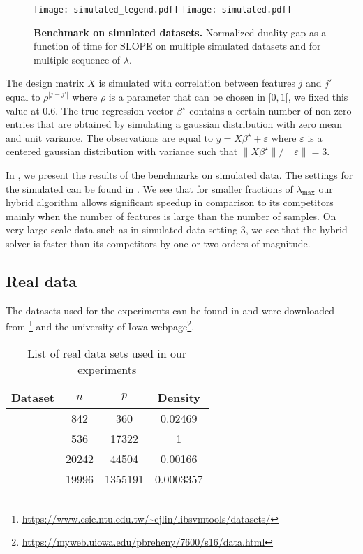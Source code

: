 \begin{figure*}[!t]
  \centering
  \texttt{[image: simulated\_legend.pdf]}
  \texttt{[image: simulated.pdf]}
  \caption{\textbf{Benchmark on simulated datasets.} Normalized duality gap as a function of time for SLOPE on multiple simulated datasets and for multiple sequence of $\lambda$.}
  \label{fig:simulated}
\end{figure*}

The design matrix $X$ is simulated with correlation between features $j$ and $j'$ equal to $\rho^{|j-j'|}$ where $\rho$ is a parameter that can be chosen in $[0, 1[$, we fixed this value at $0.6$.
The true regression vector $\beta^\star$ contains a certain number of non-zero entries that are obtained by simulating a gaussian distribution with zero mean and unit variance.
The observations are equal to $y=X\beta^\star + \varepsilon$ where $\varepsilon$ is a centered gaussian distribution with variance such that $\lVert X\beta^\star\rVert / \lVert \varepsilon \rVert = 3$.

In , we present the results of the benchmarks on simulated data.
The settings for the simulated can be found in .
We see that for smaller fractions of $\lambda_{\text{max}}$ our hybrid algorithm allows significant speedup in comparison to its competitors mainly when the number of features is large than the number of samples.
On very large scale data such as in simulated data setting $3$, we see that the hybrid solver is faster than its competitors by one or two orders of magnitude.

\subsection{Real data}

The datasets used for the experiments can be found in  and were downloaded from \footnote{\url{https://www.csie.ntu.edu.tw/~cjlin/libsvmtools/datasets/}} and the university of Iowa webpage\footnote{\url{https://myweb.uiowa.edu/pbreheny/7600/s16/data.html}}.

\begin{table}[hbt]
  \centering
  \caption{List of real data sets used in our experiments}
  \label{tab:real-data}
  \begin{tabular}{
      l
      S[table-format=5.0,round-mode=off]
      S[table-format=7.0,round-mode=off]
      S[table-format=1.5,round-mode=figures,round-precision=2]
    }
    \toprule
    Dataset            & \(n\) & \(p\)   & {Density} \\ \midrule
     & 842   & 360     & 0.02469   \\
       & 536   & 17322   & 1         \\
         & 20242 & 44504   & 0.00166   \\
       & 19996 & 1355191 & 0.0003357 \\ \bottomrule
  \end{tabular}
\end{table}

